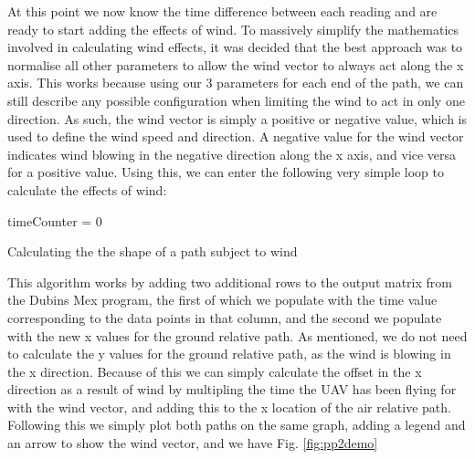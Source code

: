 At this point we now know the time difference between each reading and are ready to start adding the effects of wind. To massively simplify the mathematics involved in calculating wind effects, it was decided that the best approach was to normalise all other parameters to allow the wind vector to always act along the x axis. This works because using our 3 parameters for each end of the path, we can still describe any possible configuration when limiting the wind to act in only one direction. As such, the wind vector is simply a positive or negative value, which is used to define the wind speed and direction. A negative value for the wind vector indicates wind blowing in the negative direction along the x axis, and vice versa for a positive value. Using this, we can enter the following very simple loop to calculate the effects of wind:

\begin{center}
\begin{minipage}{\linewidth}
\begin{algorithm}[H]
\label{pp2Algorithm}
\SetAlgoLined
	timeCounter = 0\;
\caption{Calculating the the shape of a path subject to wind}
\end{algorithm}
\end{minipage}
\end{center}

This algorithm works by adding two additional rows to the output matrix from the Dubins Mex program, the first of which we populate with the time value corresponding to the data points in that column, and the second we populate with the new x values for the ground relative path. As mentioned, we do not need to calculate the y values for the ground relative path, as the wind is blowing in the x direction. Because of this we can simply calculate the offset in the x direction as a result of wind by multipling the time the UAV has been flying for with the wind vector, and adding this to the x location of the air relative path. Following this we simply plot both paths on the same graph, adding a legend and an arrow to show the wind vector, and we have Fig. \ref{fig:pp2demo}

